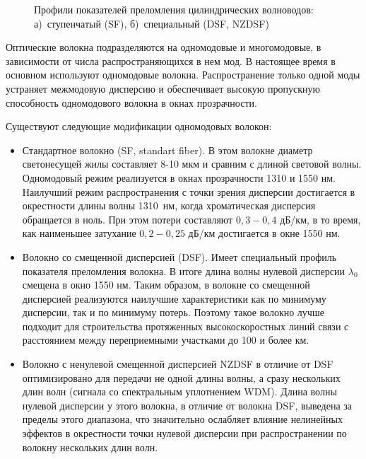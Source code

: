 \begin{figure}[h!]
	\begin{minipage}[h]{0.49\linewidth}
	\end{minipage}
	\hfill
	\begin{minipage}[h]{0.49\linewidth}
	\end{minipage}
	\caption{Профили показателей преломления цилиндрических волноводов: а)~ступенчатый (SF), б)~специальный (DSF, NZDSF)}
	\label{cylinders}
\end{figure}

Оптические волокна подразделяются на одномодовые и многомодовые, в зависимости от числа распространяющихся в нем мод. В настоящее время в основном используют одномодовые волокна. Распространение только одной моды устраняет межмодовую дисперсию и обеспечивает высокую пропускную  способность одномодового волокна в окнах прозрачности.

Существуют следующие модификации одномодовых волокон:
\begin{itemize}
\item Стандартное  волокно (SF, standart fiber). В этом волокне диаметр светонесущей жилы составляет 8-10 мкм и сравним с длиной световой волны. Одномодовый  режим  реализуется  в  окнах  прозрачности 1310 и 1550 нм. Наилучший  режим  распространения  с точки зрения дисперсии достигается  в  окрестности  длины  волны 1310~нм,  когда  хроматическая  дисперсия обращается в ноль. При этом потери составляют $0,3-0,4$ дБ/км,  в  то  время,  как  наименьшее  затухание $0,2-0,25$ дБ/км достигается в окне 1550 нм. 
\item Волокно со смещенной дисперсией (DSF). Имеет специальный профиль показателя преломления волокна. В итоге длина  волны  нулевой  дисперсии $\lambda_0$ смещена в окно 1550 нм. Таким  образом,  в  волокне  со  смещенной дисперсией реализуются наилучшие характеристики как по минимуму дисперсии, так и по минимуму  потерь.  Поэтому  такое  волокно  лучше  подходит  для  строительства протяженных  высокоскоростных  линий  связи  с  расстоянием  между  переприемными участками до 100 и более км. 
\item Волокно  с  ненулевой  смещенной  дисперсией NZDSF  в  отличие  от DSF 
оптимизировано  для  передачи  не  одной  длины  волны,  а  сразу  нескольких  длин  волн 
(сигнала  со  спектральным  уплотнением WDM). Длина волны нулевой дисперсии у этого волокна, в отличие от волокна DSF, выведена за пределы этого диапазона, что значительно ослабляет влияние нелинейных эффектов в окрестности точки нулевой дисперсии при распространении по волокну нескольких длин волн.
\end{itemize}    

